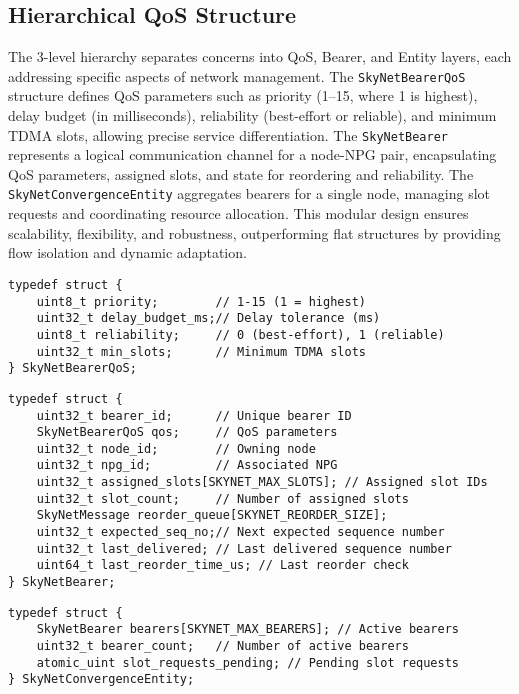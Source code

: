 \documentclass{article}
\begin{document}
\subsection{Hierarchical QoS Structure}
The 3-level hierarchy separates concerns into QoS, Bearer, and Entity layers, each addressing
specific aspects of network management. The \texttt{SkyNetBearerQoS} structure defines QoS
parameters such as priority (1--15, where 1 is highest), delay budget (in milliseconds), reliability
(best-effort or reliable), and minimum TDMA slots, allowing precise service differentiation. The
\texttt{SkyNetBearer} represents a logical communication channel for a node-NPG pair, encapsulating
QoS parameters, assigned slots, and state for reordering and reliability. The
\texttt{SkyNetConvergenceEntity} aggregates bearers for a single node, managing slot requests and
coordinating resource allocation. This modular design ensures scalability, flexibility, and
robustness, outperforming flat structures by providing flow isolation and dynamic adaptation.

\begin{lstlisting}
typedef struct {
    uint8_t priority;        // 1-15 (1 = highest)
    uint32_t delay_budget_ms;// Delay tolerance (ms)
    uint8_t reliability;     // 0 (best-effort), 1 (reliable)
    uint32_t min_slots;      // Minimum TDMA slots
} SkyNetBearerQoS;
\end{lstlisting}

\begin{lstlisting}
typedef struct {
    uint32_t bearer_id;      // Unique bearer ID
    SkyNetBearerQoS qos;     // QoS parameters
    uint32_t node_id;        // Owning node
    uint32_t npg_id;         // Associated NPG
    uint32_t assigned_slots[SKYNET_MAX_SLOTS]; // Assigned slot IDs
    uint32_t slot_count;     // Number of assigned slots
    SkyNetMessage reorder_queue[SKYNET_REORDER_SIZE];
    uint32_t expected_seq_no;// Next expected sequence number
    uint32_t last_delivered; // Last delivered sequence number
    uint64_t last_reorder_time_us; // Last reorder check
} SkyNetBearer;
\end{lstlisting}

\begin{lstlisting}
typedef struct {
    SkyNetBearer bearers[SKYNET_MAX_BEARERS]; // Active bearers
    uint32_t bearer_count;   // Number of active bearers
    atomic_uint slot_requests_pending; // Pending slot requests
} SkyNetConvergenceEntity;
\end{lstlisting}
\end{document}
